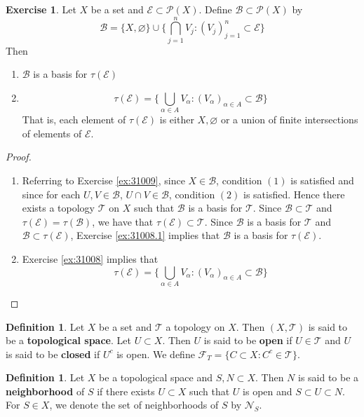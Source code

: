 \documentclass[12pt]{amsart}
\theoremstyle{definition}
\newtheorem{defn}[definition]{Definition}
\newtheorem{ex}[definition]{Exercise}
\newcommand{\al}{\alpha}
\newcommand{\MB}{\mathcal{B}}
\newcommand{\MF}{\mathcal{F}}
\newcommand{\MN}{\mathcal{N}}
\newcommand{\MP}{\mathcal{P}}
\newcommand{\ME}{\mathcal{E}}
\newcommand{\MT}{\mathcal{T}}
\newcommand{\tbf}[1]{\textbf{#1}}
\DeclareMathOperator*{\0}{\mbf{0}}
\DeclareMathOperator*{\1}{\mbf{1}}
\newcommand{\lex}[1]{\label{ex:#1}}
\newcommand{\ld}[1]{\label{defn:#1}}
\newcommand{\rex}[1]{Exercise \ref{ex:#1}}
\begin{document}
	\begin{ex} \lex{31010}
	Let $X$ be a set and $\ME \subset \MP(X)$. Define $\MB \subset \MP(X)$ by 
	$$\MB = \{X, \varnothing\} \cup  \bigg \{\bigcap_{j=1}^n V_j: (V_j)_{j=1}^n \subset \ME \bigg \}$$ 
	Then 
	\begin{enumerate}
	\item $\MB$ is a basis for $\tau(\ME)$ 
	\item $$\tau(\ME) = \bigg \{ \bigcup_{\al \in A} V_{\al}: (V_{\al})_{\al \in A} \subset \MB \bigg \}$$ That is, each element of $\tau(\ME)$ is either $X, \varnothing$ or a union of finite intersections of elements of $\ME$. 
	\end{enumerate}
	
	\end{ex}
	
	\begin{proof}\
	\begin{enumerate}
	\item Referring to \rex{31009}, since $X \in \MB$, condition $(1)$ is satisfied and since for each $U, V \in \MB$, $U \cap V \in \MB$, condition $(2)$ is satisfied. Hence there exists a topology $\MT$ on $X$ such that $\MB$ is a basis for $\MT$. Since $\MB \subset \MT$ and $\tau(\ME) = \tau(\MB)$, we have that $\tau(\ME) \subset \MT$. Since $\MB$ is a basis for $\MT$ and $\MB \subset \tau(\ME)$, \rex{31008.1} implies that $\MB$ is a basis for $\tau(\ME)$.
	\item \rex{31008} implies that $$\tau(\ME) = \bigg \{ \bigcup_{\al \in A} V_{\al}: (V_{\al})_{\al \in A} \subset \MB \bigg \}$$
	\end{enumerate}
	
	\end{proof}
	
	\begin{defn} \ld{31011}
	Let $X$ be a set and $\MT$ a topology on $X$. Then $(X, \MT)$ is said to be a \tbf{topological space}. Let $U \subset X$. Then $U$ is said to be \tbf{open} if $U \in \MT$ and $U$ is said to be \tbf{closed} if $U^c$ is open. We define $\MF_T = \{C \subset X: C^c \in \MT  \}$. 
	\end{defn}
	
	\begin{defn} \ld{31012}
	Let $X$ be a topological space and $S,N \subset X$. Then $N$ is said to be a \tbf{neighborhood} of $S$ if there exists $U \subset X$ such that $U$ is open and $S \subset U \subset N$. For $S \in X$, we denote the set of neighborhoods of $S$ by $\MN_S$.
	\end{defn}
	
\end{document}
